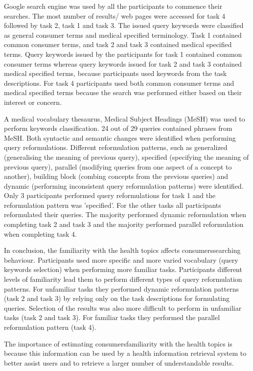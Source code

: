 \documentclass[]{article}
\begin{document}
\begin{enumerate}
Google search engine was used by all the participants to commence their searches. The most number of results/ web pages were accessed for task 4 followed by task 2, task 1 and task 3. The issued query keywords were classified as general consumer terms and medical specified terminology. Task 1 contained common consumer terms, and task 2 and task 3 contained medical specified terms. Query keywords issued  by the participants for task 1 contained common consumer terms whereas query keywords issued for task 2 and task 3 contained medical specified terms, because participants used keywords from the task descriptions. For task 4 participants used both common consumer terms and medical specified terms because the search was performed either based on their interest or concern. 

A medical vocabulary thesaurus, Medical Subject Headings (MeSH) was used to perform keywords classification. 24 out of 29 queries contained phrases from MeSH. Both syntactic and semantic changes were identified when performing query reformulations. Different reformulation patterns, such as generalized (generalising the meaning of previous query), specified (specifying the meaning of previous query), parallel (modifying queries from one aspect of a concept to another), building block (combing concepts from the previous queries) and dynamic (performing inconsistent query reformulation patterns) were identified. Only 3 participants performed query reformulations for task 1 and the reformulation pattern was 'specified'. For the other tasks all participants reformulated their queries. The majority performed dynamic reformulation when completing task 2 and task 3 and the majority performed parallel reformulation when completing task 4. 

In conclusion, the familiarity with the health topics affects consumers\textquotesingle searching behaviour. Participants used more specific and more varied vocabulary (query keywords selection) when performing more familiar tasks. Participants different levels of familiarity lead them to perform different types of query reformulation patterns. For unfamiliar tasks they performed dynamic reformulation patterns (task 2 and task 3) by relying only on the task descriptions for formulating queries. Selection of the results was also more difficult to perform in unfamiliar tasks (task 2 and task 3). For familiar tasks they performed the parallel reformulation pattern (task 4).

The importance of estimating consumers\textquotesingle  familiarity with the health topics is because this information can be used by a health information retrieval system to better assist users and to retrieve a larger number of understandable results.  


\end{enumerate}
\end{document}
